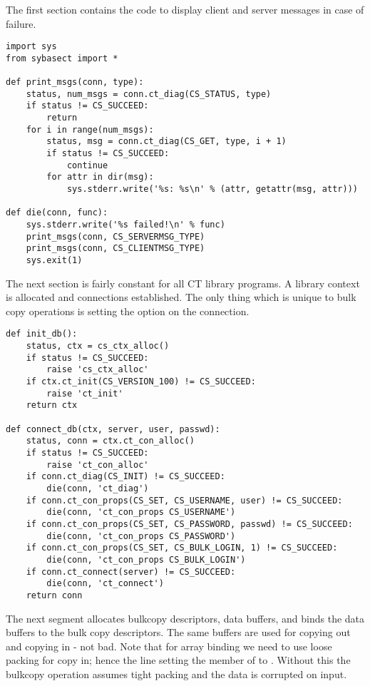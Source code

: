 The first section contains the code to display client and server
messages in case of failure.

\begin{verbatim}
import sys
from sybasect import *

def print_msgs(conn, type):
    status, num_msgs = conn.ct_diag(CS_STATUS, type)
    if status != CS_SUCCEED:
        return
    for i in range(num_msgs):
        status, msg = conn.ct_diag(CS_GET, type, i + 1)
        if status != CS_SUCCEED:
            continue
        for attr in dir(msg):
            sys.stderr.write('%s: %s\n' % (attr, getattr(msg, attr)))

def die(conn, func):
    sys.stderr.write('%s failed!\n' % func)
    print_msgs(conn, CS_SERVERMSG_TYPE)
    print_msgs(conn, CS_CLIENTMSG_TYPE)
    sys.exit(1)
\end{verbatim}

The next section is fairly constant for all CT library programs.  A
library context is allocated and connections established.  The only
thing which is unique to bulk copy operations is setting the
 option on the connection.

\begin{verbatim}
def init_db():
    status, ctx = cs_ctx_alloc()
    if status != CS_SUCCEED:
        raise 'cs_ctx_alloc'
    if ctx.ct_init(CS_VERSION_100) != CS_SUCCEED:
        raise 'ct_init'
    return ctx

def connect_db(ctx, server, user, passwd):
    status, conn = ctx.ct_con_alloc()
    if status != CS_SUCCEED:
        raise 'ct_con_alloc'
    if conn.ct_diag(CS_INIT) != CS_SUCCEED:
        die(conn, 'ct_diag')
    if conn.ct_con_props(CS_SET, CS_USERNAME, user) != CS_SUCCEED:
        die(conn, 'ct_con_props CS_USERNAME')
    if conn.ct_con_props(CS_SET, CS_PASSWORD, passwd) != CS_SUCCEED:
        die(conn, 'ct_con_props CS_PASSWORD')
    if conn.ct_con_props(CS_SET, CS_BULK_LOGIN, 1) != CS_SUCCEED:
        die(conn, 'ct_con_props CS_BULK_LOGIN')
    if conn.ct_connect(server) != CS_SUCCEED:
        die(conn, 'ct_connect')
    return conn
\end{verbatim}

The next segment allocates bulkcopy descriptors, data buffers, and
binds the data buffers to the bulk copy descriptors.  The same buffers
are used for copying out and copying in - not bad.  Note that for array
binding we need to use loose packing for copy in; hence the line
setting the  member of   to
.  Without this the bulkcopy operation
assumes tight packing and the data is corrupted on input.

